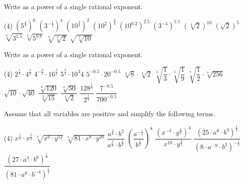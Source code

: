 \begin{exercise}
	Write as a power of a single rational exponent.
	\begin{tasks}(4)
		\task $\left(5^{\frac{2}{3}}\right)^6$
		\task $\left(3^{-\frac{1}{2}}\right)^4$
		\task $\left(10^{\frac{3}{4}}\right)^2$
		\task $\left(10^2\right)^\frac{3}{4}$
		\task $\left(10^{0.2}\right)^{2.5}$
		\task $\left(3^{-4}\right)^{1.5}$
		\task $\left(\sqrt[4]{2}\right)^{10}$
		\task $\left(\sqrt{2}\right)^5$
		\task $\sqrt[3]{3^{1.5}}$
		\task $\sqrt[4]{5^{0.8}}$
		\task $\sqrt[4]{\sqrt[3]{2}}$
		\task $\sqrt{\sqrt[5]{10}}$
	\end{tasks}
\end{exercise}
\begin{exercise}
	Write as a power of a single rational exponent.
	\begin{tasks}(4)
		\task $2^\frac{1}{3}\cdot 4^\frac{1}{3}$
		\task $4^{-\frac{2}{3}}\cdot 16^\frac{2}{3}$
		\task $5^{\frac{3}{4}}\cdot 10^{3}{4}$
		\task $5^{-0.5}\cdot 20^{-0.5}$
		\task $\sqrt[4]{8}\cdot\sqrt[4]{2}$
		\task $\sqrt[3]{\dfrac{1}{3}}\cdot\sqrt[3]{\dfrac{1}{9}}$
		\task $\sqrt[7]{\dfrac{1}{2}}\cdot\sqrt[7]{256}$
		\task $\sqrt{10}\cdot\sqrt{40}$
		\task $\dfrac{\sqrt[3]{120}}{\sqrt[3]{15}}$
		\task $\dfrac{\sqrt[4]{50}}{\sqrt[4]{2}}$
		\task $\dfrac{128^\frac{1}{3}}{2^\frac{1}{3}}$
		\task $\dfrac{7^{-0.5}}{700^{-0.5}}$
	\end{tasks}
\end{exercise}

\begin{exercise}
	Assume that all variables are positive and simplify the following terms.
	\begin{tasks}(4)
		\task $x^{\frac{1}{3}}\cdot x^{\frac{5}{6}}$
		\task $\sqrt[3]{x^6\cdot y^{12}}$
		\task $\sqrt[4]{81\cdot x^8\cdot y^{20}}$
		\task $\dfrac{a^{\frac{3}{4}}\cdot b^2}{a^\frac{7}{8}\cdot b^\frac{1}{4}}$
		\task $\left(\dfrac{a^{-\frac{1}{4}}}{b^\frac{1}{2}}\right)^8$
		\task $\dfrac{\left(x^{-3}\cdot y^{\frac{1}{2}}\right)^4}{x^{10}\cdot y^{\frac{3}{2}}}$
		\task $\dfrac{\left(25\cdot a^6\cdot b^4\right)^\frac{1}{2}}{\left(8\cdot a^{-9}\cdot b^3\right)^{-\frac{1}{2}}}$
		\task $\dfrac{\left(27\cdot a^3\cdot b^6\right)^\frac{1}{3}}{\left(81\cdot a^8\cdot b^{-4}\right)^\frac{1}{4}}$
	\end{tasks}
\end{exercise}